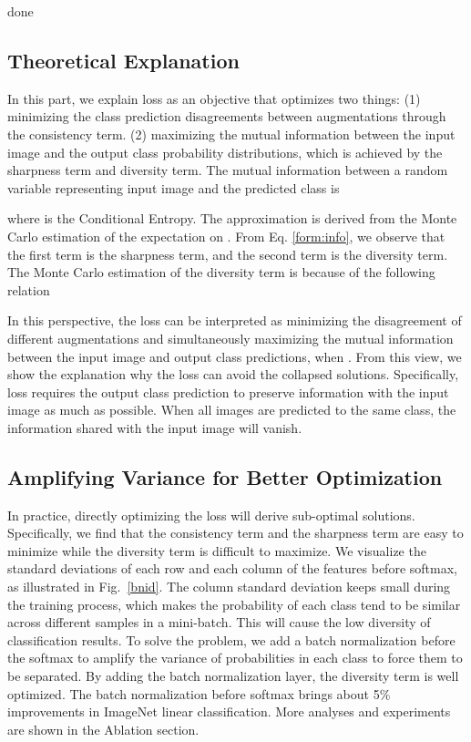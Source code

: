 \documentclass[10pt,twocolumn,letterpaper]{article}
\begin{document}
\else

done

\fi

\subsection{Theoretical Explanation}
In this part, we explain \ourmethod loss as an objective that optimizes two things: (1) minimizing the class prediction disagreements between augmentations through the consistency term. (2) maximizing the mutual information between the input image and the output class probability distributions, which is achieved by the sharpness term and diversity term. The mutual information between a random variable  representing input image and the predicted class  is

where  is the Conditional Entropy. 
The approximation is derived from the Monte Carlo estimation of the expectation on . From Eq. \ref{form:info}, we observe that the first term is the sharpness term, and the second term is the diversity term. The Monte Carlo estimation of the diversity term is because of the following relation 

In this perspective, the \ourmethod loss can be interpreted as minimizing the disagreement of different augmentations and simultaneously maximizing the mutual information between the input image and output class predictions, when . From this view, we show the explanation why the \ourmethod loss can avoid the collapsed solutions. Specifically, \ourmethod loss requires the output class prediction  to preserve information with the input image  as much as possible. When all images are predicted to the same class, the information shared with the input image will vanish.

\subsection{Amplifying Variance for Better Optimization}
In practice, directly optimizing the \ourmethod loss will derive sub-optimal solutions. Specifically, we find that the consistency term and the sharpness term are easy to minimize while the diversity term is difficult to maximize. We visualize the standard deviations of each row and each column of the features before softmax, as illustrated in Fig.~\ref{bnid}. The column standard deviation keeps small during the training process, which makes the probability of each class tend to be similar across different samples in a mini-batch. This will cause the low diversity of classification results. To solve the problem, we add a batch normalization \cite{ioffe2015batch} before the softmax to amplify the variance of probabilities in each class to force them to be separated. 
By adding the batch normalization layer, the diversity term is well optimized. 
The batch normalization before softmax brings about 5\% improvements in ImageNet linear classification. More analyses and experiments are shown in the Ablation section. 
\end{document}
